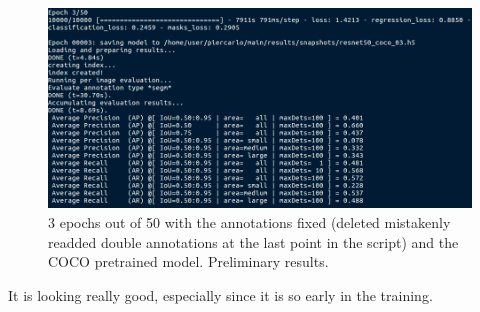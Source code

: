 \begin{figure}[H]
	\centering
	\includegraphics[width=\linewidth]{figures/train/3coconew}
	\caption{3 epochs out of 50 with the annotations fixed (deleted mistakenly readded double annotations at the last point in the script) and the COCO pretrained model. Preliminary results.}
	\label{f:train-3coconew}
\end{figure}

It is looking really good, especially since it is so early in the training.
